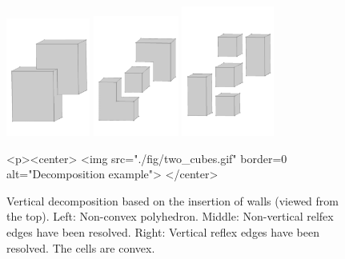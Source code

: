 \begin{figure}[h]
  \begin{ccTexOnly}
    \begin{center}
      \includegraphics[width=0.245\textwidth]{Convex_decomposition_3/fig/two_cubes} \hspace{4mm}
      \includegraphics[width=0.25\textwidth]{Convex_decomposition_3/fig/two_cubes_cylindrical} \hspace{1mm}
      \includegraphics[width=0.27\textwidth]{Convex_decomposition_3/fig/two_cubes_vertical}
    \end{center}
  \end{ccTexOnly}
  \begin{ccHtmlOnly}
    <p><center>
    <img src="./fig/two_cubes.gif" border=0 alt="Decomposition example">
    </center>
  \end{ccHtmlOnly}
  \caption{Vertical decomposition based on the insertion of walls 
	   (viewed from the top). Left: Non-convex polyhedron. Middle:
	   Non-vertical relfex edges have been resolved. Right: Vertical
           reflex edges have been resolved. The cells are convex.}
  \label{fig:verticalDecomposition}
\end{figure}

